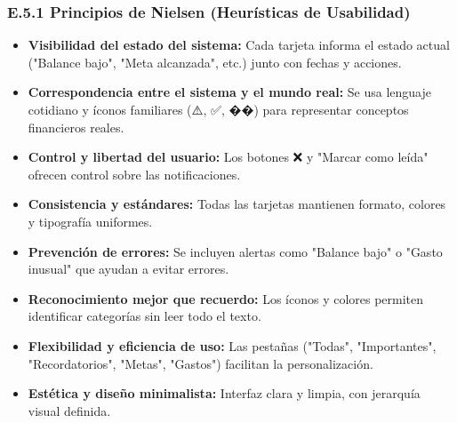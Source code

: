 \documentclass[12pt,a4paper,oneside]{article}
\begin{document}
\subsubsection*{E.5.1 Principios de Nielsen (Heurísticas de Usabilidad)}
\begin{itemize}
    \item \textbf{Visibilidad del estado del sistema:}  
    Cada tarjeta informa el estado actual ("Balance bajo", "Meta alcanzada", etc.) junto con fechas y acciones.

    \item \textbf{Correspondencia entre el sistema y el mundo real:}  
    Se usa lenguaje cotidiano y íconos familiares (⚠️, ✅, ��) para representar conceptos financieros reales.

    \item \textbf{Control y libertad del usuario:}  
    Los botones ❌ y "Marcar como leída" ofrecen control sobre las notificaciones.

    \item \textbf{Consistencia y estándares:}  
    Todas las tarjetas mantienen formato, colores y tipografía uniformes.

    \item \textbf{Prevención de errores:}  
    Se incluyen alertas como "Balance bajo" o "Gasto inusual" que ayudan a evitar errores.

    \item \textbf{Reconocimiento mejor que recuerdo:}  
    Los íconos y colores permiten identificar categorías sin leer todo el texto.

    \item \textbf{Flexibilidad y eficiencia de uso:}  
    Las pestañas ("Todas", "Importantes", "Recordatorios", "Metas", "Gastos") facilitan la personalización.

    \item \textbf{Estética y diseño minimalista:}  
    Interfaz clara y limpia, con jerarquía visual definida.
\end{itemize}
\end{document}
